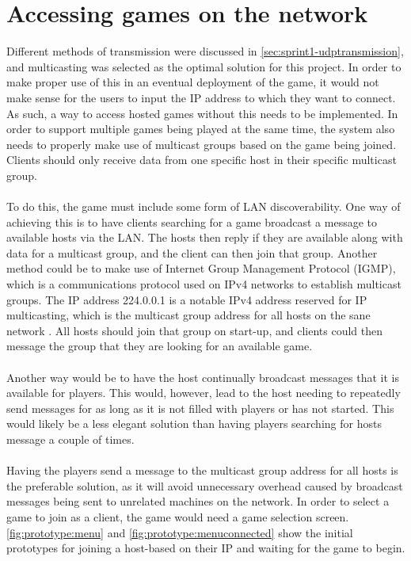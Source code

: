 \section{Accessing games on the network}
Different methods of transmission were discussed in \autoref{sec:sprint1-udptransmission}, and multicasting was selected as the optimal solution for this project.
In order to make proper use of this in an eventual deployment of the game, it would not make sense for the users to input the IP address to which they want to connect.
As such, a way to access hosted games without this needs to be implemented.
In order to support multiple games being played at the same time, the system also needs to properly make use of multicast groups based on the game being joined.
Clients should only receive data from one specific host in their specific multicast group.
\\\\
To do this, the game must include some form of LAN discoverability.
One way of achieving this is to have clients searching for a game broadcast a message to available hosts via the LAN.
The hosts then reply if they are available along with data for a multicast group, and the client can then join that group.
Another method could be to make use of Internet Group Management Protocol (IGMP), which is a communications protocol used on IPv4 networks to establish multicast groups.
The IP address 224.0.0.1 is a notable IPv4 address reserved for IP multicasting, which is the multicast group address for all hosts on the sane network \cite{ipv4multicastaddresses}.
All hosts should join that group on start-up, and clients could then message the group that they are looking for an available game.
\\\\
Another way would be to have the host continually broadcast messages that it is available for players.
This would, however, lead to the host needing to repeatedly send messages for as long as it is not filled with players or has not started.
This would likely be a less elegant solution than having players searching for hosts message a couple of times.
\\\\
Having the players send a message to the multicast group address for all hosts is the preferable solution, as it will avoid unnecessary overhead caused by broadcast messages being sent to unrelated machines on the network.
In order to select a game to join as a client, the game would need a game selection screen.
\autoref{fig:prototype:menu} and \autoref{fig:prototype:menuconnected} show the initial prototypes for joining a host-based on their IP and waiting for the game to begin.
